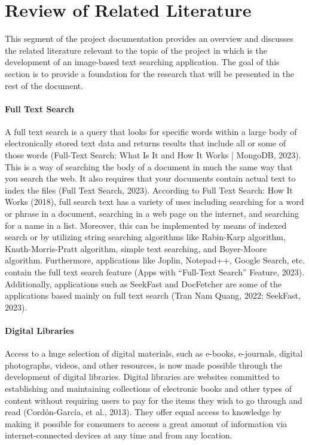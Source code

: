 \part{Review of Related Literature}

\hspace\parindent
This segment of the project documentation provides an overview and discusses the related literature relevant to the topic of the project in which is the development of an image-based text searching application. The goal of this section is to provide a foundation for the research that will be presented in the rest of the document.


\subsection*{Full Text Search}
\hspace\parindent
A full text search is a query that looks for specific words within a large body of electronically stored text data and returns results that include all or some of those words (Full-Text Search: What Is It and How It Works | MongoDB, 2023). This is a way of searching the body of a document in much the same way that you search the web. It also requires that your documents contain actual text to index the files (Full Text Search, 2023). According to Full Text Search: How It Works (2018), full search text has a variety of uses including searching for a word or phrase in a document, searching in a web page on the internet, and searching for a name in a list. Moreover, this can be implemented by means of indexed search or by utilizing string searching algorithms like Rabin-Karp algorithm, Knuth-Morris-Pratt algorithm, simple text searching, and Boyer-Moore algorithm. Furthermore, applications like Joplin, Notepad++, Google Search, etc. contain the full text search feature (Apps with “Full-Text Search” Feature, 2023). Additionally, applications such as SeekFast and DocFetcher are some of the applications based mainly on full text search (Tran Nam Quang, 2022; SeekFast, 2023).

\subsection*{Digital Libraries}
\hspace\parindent
Access to a huge selection of digital materials, such as e-books, e-journals, digital photographs, videos, and other resources, is now made possible through the development of digital libraries. Digital libraries are websites committed to establishing and maintaining collections of electronic books and other types of content without requiring users to pay for the items they wish to go through and read (Cordón-García, et al., 2013). They offer equal access to knowledge by making it possible for consumers to access a great amount of information via internet-connected devices at any time and from any location.

